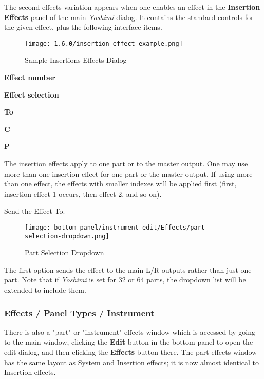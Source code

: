    The second effects variation
   appears when one enables an effect in the
   \textbf{Insertion Effects}
   panel of the main \textsl{Yoshimi} dialog.
   It contains the standard
   controls for the given effect, plus the following interface items.

\begin{figure}[H]
   \centering
   \texttt{[image: 1.6.0/insertion\_effect\_example.png]}
   \caption{Sample Insertions Effects Dialog}
   \label{fig:sample_insertion_effects_dialog}
\end{figure}

   \begin{enumber}
      \item \textbf{Effect number}
      \item \textbf{Effect selection}
      \item \textbf{To}
      \item \textbf{C}
      \item \textbf{P}
   \end{enumber}

   The insertion effects apply to one part or to the master output.
   One may use more
   than one insertion effect for one part or the master output.
   If using more than one effect, the
   effects with smaller indexes will be applied first (first, insertion
   effect 1 occurs, then effect 2, and so on).

   \setcounter{ItemCounter}{0}      %

   Send the Effect To.

\begin{figure}[H]
   \centering
   \texttt{[image: bottom-panel/instrument-edit/Effects/part-selection-dropdown.png]}
   \caption{Part Selection Dropdown}
   \label{fig:sample_part_selection_dropdown}
\end{figure}
   The first option sends the effect to the main L/R outputs rather than
   just one part.
   Note that if \textsl{Yoshimi} is set for 32 or 64 parts, the dropdown list
   will be extended to include them.

\subsubsection{Effects / Panel Types / Instrument }
\label{subsubsec:effects_paneltypes_instrument}

   There is also a "part" or "instrument" effects window which is accessed
   by going to the main window, clicking the \textbf{Edit} button in the
   bottom panel to open the edit dialog, and then clicking the
   \textbf{Effects} button there.  The part effects window has the
   same layout as System and Insertion effects; it is now almost identical
   to Insertion effects.

